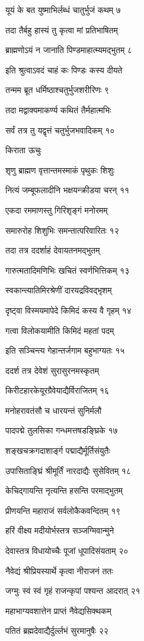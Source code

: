 यूयं के बत युष्माभिर्लब्धं चातुर्भुजं कथम् ७

तदा तैर्बहु हास्यं तु कृत्वा मां प्रतिभाषितम्

ब्राह्मणोऽयं न जानाति पिण्डमाहात्म्यमद्भुतम् ८

इति श्रुत्वाऽवदं चाहं कः पिण्डः कस्य दीयते

तन्मम ब्रूत धर्मिष्ठाश्चतुर्भुजशरीरिणः ९

तदा मद्वाक्यमाकर्ण्य कथितं तैर्महात्मभिः

सर्वं तत्र तु यद्वृत्तं चतुर्भुजभवादिकम् १०

किराता ऊचुः

शृणु ब्राह्मण वृत्तान्तमस्माकं पृथुकः शिशुः

नित्यं जम्बूफलादीनि भक्षयन्क्रीडया चरन् ११

एकदा रममाणस्तु गिरिशृङ्गं मनोरमम्

समारुरोह शिशुभिः समन्तात्परिवारितः १२

तदा तत्र ददर्शाहं देवायतनमद्भुतम्

गारुत्मतादिमणिभिः खचितं स्वर्णभित्तिकम् १३

स्वकान्त्यातिमिरश्रेणीं दारयद्रविवद्भृशम्

दृष्ट्वा विस्मयमापेदे किमिदं कस्य वै गृहम् १४

गत्वा विलोकयामीति किमिदं महतां पदम्

इति सञ्चिन्त्य गेहान्तर्जगाम बहुभाग्यतः १५

ददर्श तत्र देवेशं सुरासुरनमस्कृतम्

किरीटहारकेयूरग्रैवेयाद्यैर्विराजितम् १६

मनोहरावतंसौ च धारयन्तं सुनिर्मलौ

पादपद्मे तुलसिका गन्धमत्तषडङ्घ्रिके १७

शङ्खचक्रगदाशार्ङ्ग पद्माद्यैर्मूर्तिसंयुतैः

उपासिताङ्घ्रिं श्रीमूर्तिं नारदाद्यैः सुसेवितम् १८

केचिद्गायन्ति नृत्यन्ति हसन्ति परमाद्भुतम्

प्रीणयन्ति महाराजं सर्वलोकैकवन्दितम् १९

हरिं वीक्ष्य मदीयोर्भस्तत्र सञ्जग्मिवान्मुने

देवास्तत्र विधायोच्चैः पूजां धूपादिसंयताम् २०

नैवेद्यं श्रीप्रियस्यार्थे कृत्वा नीराजनं ततः

जग्मुः स्वं स्वं गृहं राजन्कृपां पश्यन्त आदरात् २१

महाभाग्यवशात्तेन प्राप्तं नैवेद्यसिक्थकम्

पतितं ब्रह्मदेवाद्यैर्दुर्ल्लभं सुरमानुषैः २२


